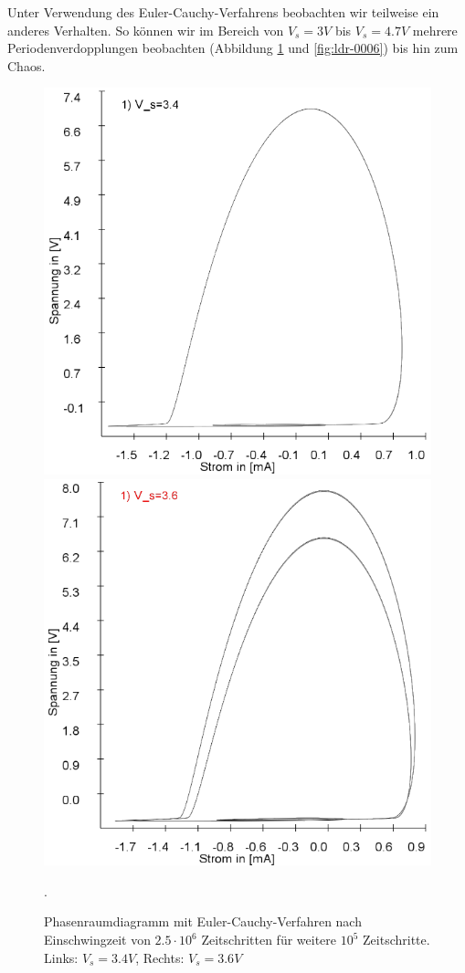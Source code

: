 \documentclass{scrartcl}
\begin{document}
Unter Verwendung des Euler-Cauchy-Verfahrens beobachten wir teilweise ein anderes Verhalten. So können wir im Bereich von $V_s=3V$ bis $V_s=4.7V$ mehrere Periodenverdopplungen beobachten (Abbildung \ref{fig:ldr-0005} und \ref{fig:ldr-0006}) bis hin zum Chaos.
\begin{figure}[!htbp]
\includegraphics[scale=0.42]{schwing-euler-nach2500k-weitere100k-3,4V}
\includegraphics[scale=0.42]{schwing-euler-nach2500k-weitere100k-3,6V}
\caption{Phasenraumdiagramm mit Euler-Cauchy-Verfahren nach Einschwingzeit von $2.5\cdot10^6$ Zeitschritten für weitere $10^5$ Zeitschritte. Links: $V_s=3.4V$, Rechts: $V_s=3.6V$}. 
\label{fig:ldr-0005}
\end{figure}
\end{document}
